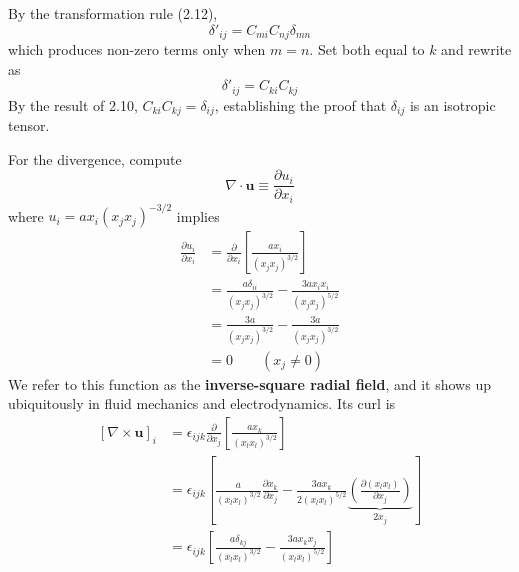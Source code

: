 \documentclass[a4paper]{article}
\begin{document}
\newpage


By the transformation rule (2.12), 
\[
	\delta'_{ij} = C_{mi}C_{nj}\delta_{mn} 
\]
which produces non-zero terms only when \( m = n \). Set both equal to \( k \) and rewrite as 
\[
	\delta'_{ij} = C_{ki}C_{kj}
\]
By the result of 2.10, \( C_{ki}C_{kj} = \delta_{ij} \), establishing the proof that \( \delta_{ij} \) is an isotropic tensor.

\vspace{12pt}


For the divergence, compute
\[
	\nabla \cdot \pmb{u} \equiv \frac{\partial u_{i}}{\partial x_{i}} 
\]
where \( u_{i} = ax_{i}\!\left( x_{j}x_{j} \right)^{-3/2} \) implies
\begin{align*}
	\frac{\partial u_{i}}{\partial x_{i}} & = \frac{\partial }{\partial x_{i}}\!\left[ \frac{ax_{i}}{\!\left( x_{j}x_{j} \right)^{3/2}} \right] \\
					      & = \frac{a \delta_{ii}}{\!\left( x_{j}x_{j} \right)^{3/2}} - \frac{3ax_{i}x_{i}}{\!\left( x_{j}x_{j} \right)^{5/2}} \\
					      & = \frac{3a}{\!\left( x_{j}x_{j} \right)^{3/2}} - \frac{3a}{\!\left( x_{j}x_{j} \right)^{3/2}} \\
					      & = 0 \qquad \!\left( x_{j} \neq 0 \right)
\end{align*}
We refer to this function as the \textbf{inverse-square radial field}, and it shows up ubiquitously in fluid mechanics and electrodynamics. Its curl is
\begin{align*}
	\!\left[ \nabla \times \pmb{u} \right]_{i} & = \epsilon_{ijk}\frac{\partial }{\partial x_{j}}\!\left[ \frac{ax_{k}}{\!\left( x_{l}x_{l} \right)^{3/2}} \right] \\
						   & = \epsilon_{ijk}\!\left[ \frac{a}{\!\left( x_{l}x_{l} \right)^{3/2}}\frac{\partial x_{k}}{\partial x_{j}} - \frac{3ax_{k}}{2\!\left( x_{l}x_{l} \right)^{5/2}} \underbrace{\!\left(\frac{\partial \!\left( x_{l}x_{l} \right)}{\partial x_{j}} \right)}_{2x_{j}} \right] \\ 
	 & = \epsilon_{ijk}\!\left[ \frac{a \delta_{kj}}{\!\left( x_{l}x_{l} \right)^{3/2}} - \frac{3ax_{k}x_{j}}{\!\left( x_{l}x_{l} \right)^{5/2}} \right]
\end{align*}
\end{document}
